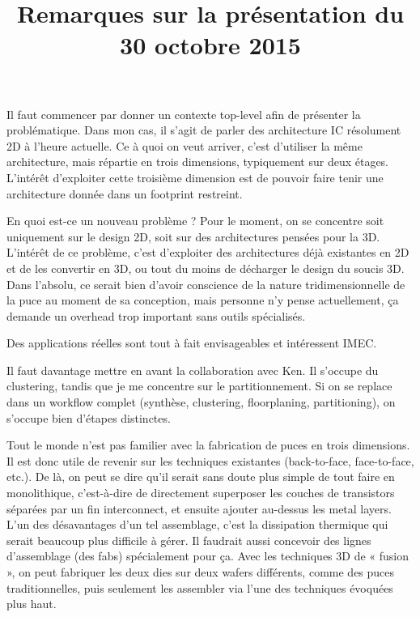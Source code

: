 \documentclass[12pt,a4paper]{article}
\title{Remarques sur la présentation du 30 octobre 2015}
\begin{document}
\maketitle

Il faut commencer par donner un contexte top-level afin de présenter la problématique.
Dans mon cas, il s'agit de parler des architecture IC résolument 2D à l'heure actuelle.
Ce à quoi on veut arriver, c'est d'utiliser la même architecture, mais répartie en trois dimensions, typiquement sur deux étages.
L'intérêt d'exploiter cette troisième dimension est de pouvoir faire tenir une architecture donnée dans un footprint restreint.\newline{}

En quoi est-ce un nouveau problème ?
Pour le moment, on se concentre soit uniquement sur le design 2D, soit sur des architectures pensées pour la 3D. L'intérêt de ce problème, c'est d'exploiter des architectures déjà existantes en 2D et de les convertir en 3D, ou tout du moins de décharger le design du soucis 3D.
Dans l'absolu, ce serait bien d'avoir conscience de la nature tridimensionnelle de la puce au moment de sa conception, mais personne n'y pense actuellement, ça demande un overhead trop important sans outils spécialisés.
~\newline{}

Des applications réelles sont tout à fait envisageables et intéressent IMEC.\newline{}

Il faut davantage mettre en avant la collaboration avec Ken. Il s'occupe du clustering, tandis que je me concentre sur le partitionnement.
Si on se replace dans un workflow complet (synthèse, clustering, floorplaning, partitioning), on s'occupe bien d'étapes distinctes.\newline{}

Tout le monde n'est pas familier avec la fabrication de puces en trois dimensions.
Il est donc utile de revenir sur les techniques existantes (back-to-face, face-to-face, etc.).
De là, on peut se dire qu'il serait sans doute plus simple de tout faire en monolithique, c'est-à-dire de directement superposer les couches de transistors séparées par un fin interconnect, et ensuite ajouter au-dessus les metal layers.
L'un des désavantages d'un tel assemblage, c'est la dissipation thermique qui serait beaucoup plus difficile à gérer.
Il faudrait aussi concevoir des lignes d'assemblage (des fabs) spécialement pour ça.
Avec les techniques 3D de « fusion », on peut fabriquer les deux dies sur deux wafers différents, comme des puces traditionnelles, puis seulement les assembler via l'une des techniques évoquées plus haut.
~\newline{}
\end{document}
